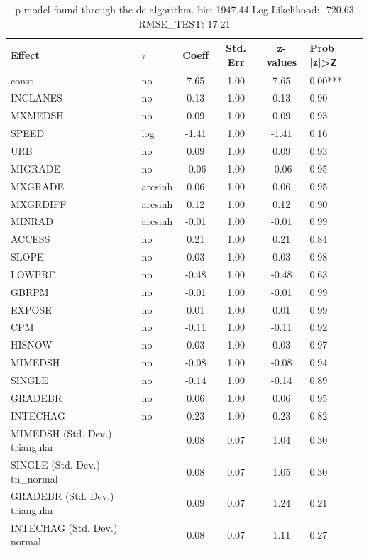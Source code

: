 \begin{table}
	\caption{p model found through the de algorithm. bic: 1947.44 Log-Likelihood: -720.63 RMSE_TEST: 17.21}
	\begin{center}
		\begin{tabular}{|l|l|c|c|c|l|}
			\hline
			Effect & $\tau$ & Coeff & Std. Err & z-values & Prob |z|>Z \\
			\hline
			const & no & 7.65 & 1.00 & 7.65 & 0.00*** \\
			\hline
			INCLANES & no & 0.13 & 1.00 & 0.13 & 0.90 \\
			\hline
			MXMEDSH & no & 0.09 & 1.00 & 0.09 & 0.93 \\
			\hline
			SPEED & log & -1.41 & 1.00 & -1.41 & 0.16 \\
			\hline
			URB & no & 0.09 & 1.00 & 0.09 & 0.93 \\
			\hline
			MIGRADE & no & -0.06 & 1.00 & -0.06 & 0.95 \\
			\hline
			MXGRADE & arcsinh & 0.06 & 1.00 & 0.06 & 0.95 \\
			\hline
			MXGRDIFF & arcsinh & 0.12 & 1.00 & 0.12 & 0.90 \\
			\hline
			MINRAD & arcsinh & -0.01 & 1.00 & -0.01 & 0.99 \\
			\hline
			ACCESS & no & 0.21 & 1.00 & 0.21 & 0.84 \\
			\hline
			SLOPE & no & 0.03 & 1.00 & 0.03 & 0.98 \\
			\hline
			LOWPRE & no & -0.48 & 1.00 & -0.48 & 0.63 \\
			\hline
			GBRPM & no & -0.01 & 1.00 & -0.01 & 0.99 \\
			\hline
			EXPOSE & no & 0.01 & 1.00 & 0.01 & 0.99 \\
			\hline
			CPM & no & -0.11 & 1.00 & -0.11 & 0.92 \\
			\hline
			HISNOW & no & 0.03 & 1.00 & 0.03 & 0.97 \\
			\hline
			MIMEDSH & no & -0.08 & 1.00 & -0.08 & 0.94 \\
			\hline
			SINGLE & no & -0.14 & 1.00 & -0.14 & 0.89 \\
			\hline
			GRADEBR & no & 0.06 & 1.00 & 0.06 & 0.95 \\
			\hline
			INTECHAG & no & 0.23 & 1.00 & 0.23 & 0.82 \\
			\hline
			MIMEDSH (Std. Dev.) triangular &  & 0.08 & 0.07 & 1.04 & 0.30 \\
			\hline
			SINGLE (Std. Dev.) tn_normal &  & 0.08 & 0.07 & 1.05 & 0.30 \\
			\hline
			GRADEBR (Std. Dev.) triangular &  & 0.09 & 0.07 & 1.24 & 0.21 \\
			\hline
			INTECHAG (Std. Dev.) normal &  & 0.08 & 0.07 & 1.11 & 0.27 \\
			\hline
		\end{tabular}
	\end{center}
\end{table}